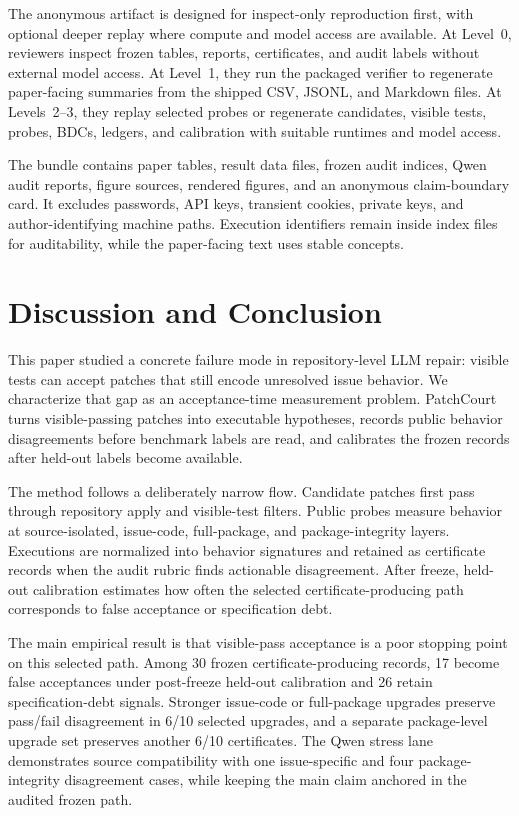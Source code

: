 \documentclass[conference]{IEEEtran}
\newcommand{\patchcourt}{PatchCourt\xspace}
\begin{document}
The anonymous artifact is designed for inspect-only reproduction first, with optional deeper replay where compute and model access are available.
At Level~0, reviewers inspect frozen tables, reports, certificates, and audit labels without external model access.
At Level~1, they run the packaged verifier to regenerate paper-facing summaries from the shipped CSV, JSONL, and Markdown files.
At Levels~2--3, they replay selected probes or regenerate candidates, visible tests, probes, BDCs, ledgers, and calibration with suitable runtimes and model access.

The bundle contains paper tables, result data files, frozen audit indices, Qwen audit reports, figure sources, rendered figures, and an anonymous claim-boundary card.
It excludes passwords, API keys, transient cookies, private keys, and author-identifying machine paths.
Execution identifiers remain inside index files for auditability, while the paper-facing text uses stable concepts.

\section{Discussion and Conclusion}

This paper studied a concrete failure mode in repository-level LLM repair: visible tests can accept patches that still encode unresolved issue behavior.
We characterize that gap as an acceptance-time measurement problem.
\patchcourt turns visible-passing patches into executable hypotheses, records public behavior disagreements before benchmark labels are read, and calibrates the frozen records after held-out labels become available.

The method follows a deliberately narrow flow.
Candidate patches first pass through repository apply and visible-test filters.
Public probes measure behavior at source-isolated, issue-code, full-package, and package-integrity layers.
Executions are normalized into behavior signatures and retained as certificate records when the audit rubric finds actionable disagreement.
After freeze, held-out calibration estimates how often the selected certificate-producing path corresponds to false acceptance or specification debt.

The main empirical result is that visible-pass acceptance is a poor stopping point on this selected path.
Among 30 frozen certificate-producing records, 17 become false acceptances under post-freeze held-out calibration and 26 retain specification-debt signals.
Stronger issue-code or full-package upgrades preserve pass/fail disagreement in 6/10 selected upgrades, and a separate package-level upgrade set preserves another 6/10 certificates.
The Qwen stress lane demonstrates source compatibility with one issue-specific and four package-integrity disagreement cases, while keeping the main claim anchored in the audited frozen path.
\end{document}
